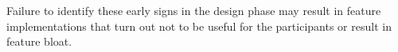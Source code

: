  \npar Failure to identify these early signs in the design phase may result in feature implementations that turn out not to be useful for the participants or result in feature bloat.
 